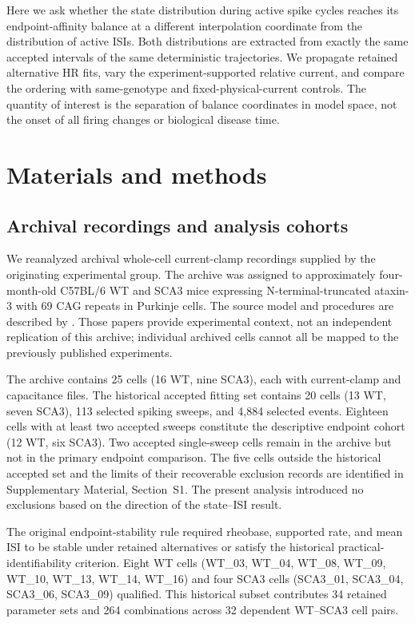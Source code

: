 \documentclass[utf8]{FrontiersinHarvard}
\newcommand{\sref}[1]{Supplementary Material, Section~#1}
\begin{document}
Here we ask whether the state distribution during active spike cycles reaches its endpoint-affinity balance at a different interpolation coordinate from the distribution of active ISIs. Both distributions are extracted from exactly the same accepted intervals of the same deterministic trajectories. We propagate retained alternative HR fits, vary the experiment-supported relative current, and compare the ordering with same-genotype and fixed-physical-current controls. The quantity of interest is the separation of balance coordinates in model space, not the onset of all firing changes or biological disease time.

\section{Materials and methods}\label{sec:methods}
\subsection{Archival recordings and analysis cohorts}\label{sec:recordings}
We reanalyzed archival whole-cell current-clamp recordings supplied by the originating experimental group. The archive was assigned to approximately four-month-old C57BL/6 WT and SCA3 mice expressing N-terminal-truncated ataxin-3 with 69 CAG repeats in Purkinje cells. The source model and procedures are described by \citet{oue2009,konno2014}. Those papers provide experimental context, not an independent replication of this archive; individual archived cells cannot all be mapped to the previously published experiments.

The archive contains 25 cells (16 WT, nine SCA3), each with current-clamp and capacitance files. The historical accepted fitting set contains 20 cells (13 WT, seven SCA3), 113 selected spiking sweeps, and 4,884 selected events. Eighteen cells with at least two accepted sweeps constitute the descriptive endpoint cohort (12 WT, six SCA3). Two accepted single-sweep cells remain in the archive but not in the primary endpoint comparison. The five cells outside the historical accepted set and the limits of their recoverable exclusion records are identified in \sref{S1}. The present analysis introduced no exclusions based on the direction of the state--ISI result.

The original endpoint-stability rule required rheobase, supported rate, and mean ISI to be stable under retained alternatives or satisfy the historical practical-identifiability criterion. Eight WT cells (WT\_03, WT\_04, WT\_08, WT\_09, WT\_10, WT\_13, WT\_14, WT\_16) and four SCA3 cells (SCA3\_01, SCA3\_04, SCA3\_06, SCA3\_09) qualified. This historical subset contributes 34 retained parameter sets and 264 combinations across 32 dependent WT--SCA3 cell pairs.
\end{document}
